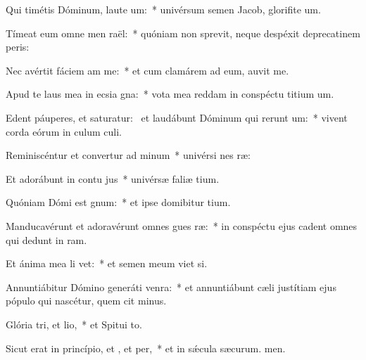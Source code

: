 \item Qui timétis Dóminum, laute um:~* univérsum semen Jacob, glorifite um.
\item Tímeat eum omne men raël:~* quóniam non sprevit, neque despéxit deprecatinem peris:
\item Nec avértit fáciem am  me:~* et cum clamárem ad eum, auvit me.
\item Apud te laus mea in ecsia gna:~* vota mea reddam in conspéctu titium um.
\item Edent páuperes, et saturatur:~\pscross{} et laudábunt Dóminum qui rerunt um:~* vivent corda eórum in culum culi.
\item Reminiscéntur et convertur ad minum~* univérsi nes ræ:
\item Et adorábunt in contu jus~* univérsæ faliæ tium.
\item Quóniam Dómi est gnum:~* et ipse domibitur tium.
\item Manducavérunt et adoravérunt omnes gues ræ:~* in conspéctu ejus cadent omnes qui dedunt in ram.
\item Et ánima mea li vet:~* et semen meum viet si.
\item Annuntiábitur Dómino generáti venra:~* et annuntiábunt cæli justítiam ejus pópulo qui nascétur, quem cit minus.
\item Glória tri, et lio,~* et Spitui to.
\item Sicut erat in princípio, et , et per,~* et in sǽcula sæcurum. men.

